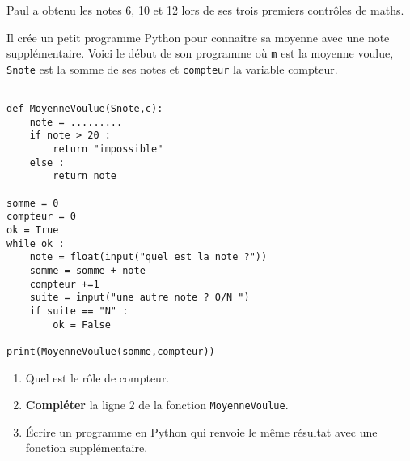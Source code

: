
Paul a obtenu les notes 6, 10 et 12 lors de ses trois premiers contrôles de maths. 

 Il crée un petit programme Python pour connaitre sa moyenne avec une note supplémentaire. Voici le début de son programme où \texttt{m} est la moyenne voulue, \texttt{Snote} est la somme de ses notes et \texttt{compteur} la variable compteur.
 
\begin{lstlisting} 

def MoyenneVoulue(Snote,c):
	note = .........
	if note > 20 :
		return "impossible"
	else :
		return note

somme = 0
compteur = 0
ok = True
while ok :
	note = float(input("quel est la note ?"))
	somme = somme + note
	compteur +=1
	suite = input("une autre note ? O/N ")
	if suite == "N" :
		ok = False
		
print(MoyenneVoulue(somme,compteur))		
\end{lstlisting} 


\begin{enumerate}
\item Quel est le rôle de compteur.
\item \textbf{Compléter} la ligne 2 de la fonction \texttt{MoyenneVoulue}.
\item Écrire un programme en Python qui renvoie le même résultat avec une fonction supplémentaire.
\end{enumerate} 